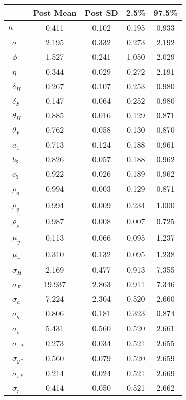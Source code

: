 \begin{tiny}\begin{tabular}{lcccc}
\hline
&\textbf{Post Mean}&\textbf{Post SD}&\textbf{2.5\%}&\textbf{97.5\%}\\\hline
\textbf{$ h             $}&0.411&0.102&0.195&0.933\\\
\textbf{$ \sigma        $}&2.195&0.332&0.273&2.192\\\
\textbf{$ \phi          $}&1.527&0.241&1.050&2.029\\\
\textbf{$ \eta          $}&0.344&0.029&0.272&2.191\\\
\textbf{$ \delta_{H}    $}&0.267&0.107&0.253&0.980\\\
\textbf{$ \delta_{F}    $}&0.147&0.064&0.252&0.980\\\
\textbf{$ \theta_{H}    $}&0.885&0.016&0.129&0.871\\\
\textbf{$ \theta_{F}    $}&0.762&0.058&0.130&0.870\\\
\textbf{$ a_{1}         $}&0.713&0.124&0.188&0.961\\\
\textbf{$ b_{2}         $}&0.826&0.057&0.188&0.962\\\
\textbf{$ c_{3}         $}&0.922&0.026&0.189&0.962\\\
\textbf{$ \rho_{a}      $}&0.994&0.003&0.129&0.871\\\
\textbf{$ \rho_{q}      $}&0.994&0.009&0.234&1.000\\\
\textbf{$ \rho_{s}      $}&0.987&0.008&0.007&0.725\\\
\textbf{$ \mu_{y}       $}&0.113&0.066&0.095&1.237\\\
\textbf{$ \mu_{r}       $}&0.310&0.132&0.095&1.238\\\
\textbf{$ \sigma_{H}    $}&2.169&0.477&0.913&7.355\\\
\textbf{$ \sigma_{F}    $}&19.937&2.863&0.911&7.346\\\
\textbf{$ \sigma_{a}    $}&7.224&2.304&0.520&2.660\\\
\textbf{$ \sigma_{q}    $}&0.806&0.181&0.323&0.874\\\
\textbf{$ \sigma_{s}    $}&5.431&0.560&0.520&2.661\\\
\textbf{$ \sigma_{\pi*} $}&0.273&0.034&0.521&2.655\\\
\textbf{$ \sigma_{y*}   $}&0.560&0.079&0.520&2.659\\\
\textbf{$ \sigma_{r*}   $}&0.214&0.024&0.521&2.669\\\
\textbf{$ \sigma_{r}    $}&0.414&0.050&0.521&2.662\\\hline
\end{tabular}
\end{tiny}